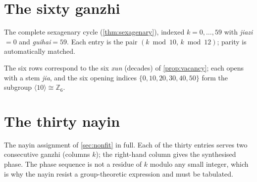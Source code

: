 \documentclass[11pt,a4paper]{article}
\theoremstyle{definition}
\theoremstyle{remark}
\newcommand{\Z}{\mathbb{Z}}
\begin{document}
\section{The sixty ganzhi}\label{app:ganzhi}
The complete sexagenary cycle (\cref{thm:sexagenary}), indexed $k=0,\dots,59$ with \emph{jiazi}$=0$ and \emph{guihai}$=59$. Each entry is the pair $(k\bmod 10,\,k\bmod 12)$; parity is automatically matched.

\begin{center}\footnotesize
{}
\end{center}

The six rows correspond to the six \emph{xun} (decades) of \cref{prop:vacancy}; each opens with a stem \emph{jia}, and the six opening indices $\{0,10,20,30,40,50\}$ form the subgroup $\langle10\rangle\cong\Z_6$.

\section{The thirty nayin}\label{app:nayin}
The nayin assignment of \cref{sec:nonfit} in full. Each of the thirty entries serves two consecutive ganzhi (columns $k$); the right-hand column gives the synthesised phase. The phase sequence is not a residue of $k$ modulo any small integer, which is why the nayin resist a group-theoretic expression and must be tabulated.
\end{document}
